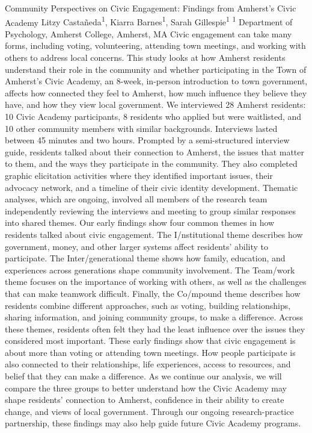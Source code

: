 \makeabstract
    {
    Community Perspectives on Civic Engagement: Findings from Amherst{\textquoteright}s Civic Academy
    }
    {
    Litzy Casta\~neda\textsuperscript{1}, Kiarra Barnes\textsuperscript{1}, Sarah Gillespie\textsuperscript{1}
    }
    {
    \textsuperscript{1} Department of Psychology, Amherst College, Amherst, MA
    }
    {
    Civic engagement can take many forms, including voting, volunteering, attending town meetings, and working with others to address local concerns. This study looks at how Amherst residents understand their role in the community and whether participating in the Town of Amherst{\textquoteright}s Civic Academy, an 8-week, in-person introduction to town government, affects how connected they feel to Amherst, how much influence they believe they have, and how they view local government.
    }
    {
    We interviewed 28 Amherst residents: 10 Civic Academy participants, 8 residents who applied but were waitlisted, and 10 other community members with similar backgrounds. Interviews lasted between 45 minutes and two hours. Prompted by a semi-structured interview guide, residents talked about their connection to Amherst, the issues that matter to them, and the ways they participate in the community. They also completed graphic elicitation activities where they identified important issues, their advocacy network, and a timeline of their civic identity development.  Thematic analyses, which are ongoing, involved all members of the research team independently reviewing the interviews and meeting to group similar responses into shared themes.
    }
    {
    Our early findings show four common themes in how residents talked about civic engagement. The I/nstitutional theme describes how government, money, and other larger systems affect residents{\textquoteright} ability to participate. The Inter/generational theme shows how family, education, and experiences across generations shape community involvement. The Team/work theme focuses on the importance of working with others, as well as the challenges that can make teamwork difficult. Finally, the Co/mpound theme describes how residents combine different approaches, such as voting, building relationships, sharing information, and joining community groups, to make a difference. Across these themes, residents often felt they had the least influence over the issues they considered most important.
    }
    {
    These early findings show that civic engagement is about more than voting or attending town meetings. How people participate is also connected to their relationships, life experiences, access to resources, and belief that they can make a difference. As we continue our analysis, we will compare the three groups to better understand how the Civic Academy may shape residents{\textquoteright} connection to Amherst, confidence in their ability to create change, and views of local government. Through our ongoing research-practice partnership, these findings may also help guide future Civic Academy programs.
    }

    \newpage
    
